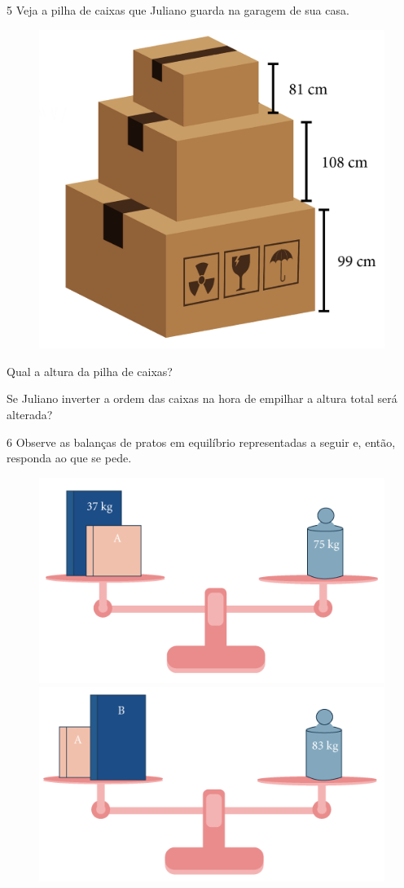 \pagebreak

\num{5} Veja a pilha de caixas que Juliano guarda na garagem de sua casa.

\begin{figure}[htpb!]
\centering
\includegraphics[width=.5\textwidth]{../ilustracoes/MAT5/SAEB_5ANO_MAT_figura19.png}
\end{figure}

\begin{escolha}
\item
  Qual a altura da pilha de caixas?\\
\bigskip

\item
  Se Juliano inverter a ordem das caixas na hora de empilhar a altura
  total será alterada?\\
\end{escolha}


\num{6} Observe as balanças de pratos em equilíbrio representadas a seguir e, então, responda ao que se pede.

\begin{figure}[htpb!]
\includegraphics[width=.5\textwidth]{../ilustracoes/MAT5/SAEB_5ANO_MAT_figura20a.png}
\includegraphics[width=.5\textwidth]{../ilustracoes/MAT5/SAEB_5ANO_MAT_figura20b.png}
\end{figure}

